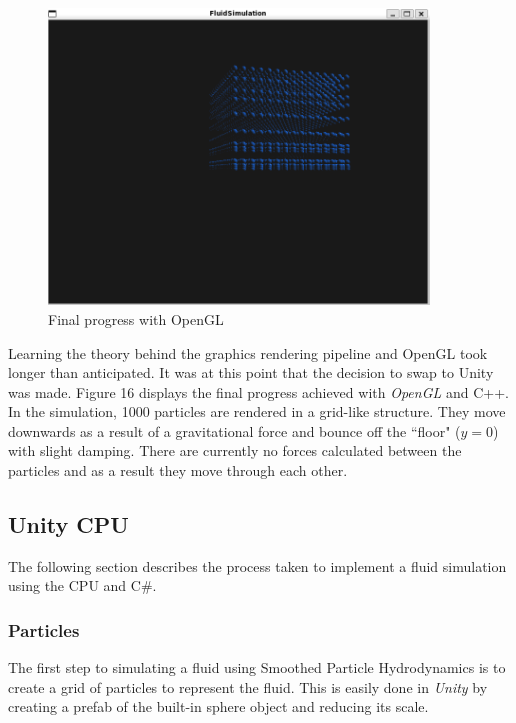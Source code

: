\documentclass[12pt]{article}
\begin{document}
    \begin{figure}[H]
        \begin{center}
            \noindent\includegraphics[width=0.9\textwidth]{openGLProg.png}
            \caption{Final progress with OpenGL}
        \end{center}
    \end{figure}
    
    Learning the theory behind the graphics rendering pipeline and OpenGL took longer than anticipated. It was at this point that the decision to swap to Unity was made. Figure 16 displays the final progress achieved with \textit{OpenGL} and C++. In the simulation, 1000 particles are rendered in a grid-like structure. They move downwards as a result of a gravitational force and bounce off the ``floor" ($y = 0$) with slight damping. There are currently no forces calculated between the particles and as a result they move through each other.

    \subsection{Unity CPU}

    The following section describes the process taken to implement a fluid simulation using the CPU and C\#.

    \subsubsection{Particles}

    The first step to simulating a fluid using Smoothed Particle Hydrodynamics is to create a grid of particles to represent the fluid. This is easily done in \textit{Unity} by creating a prefab of the built-in sphere object and reducing its scale.
    
\end{document}
